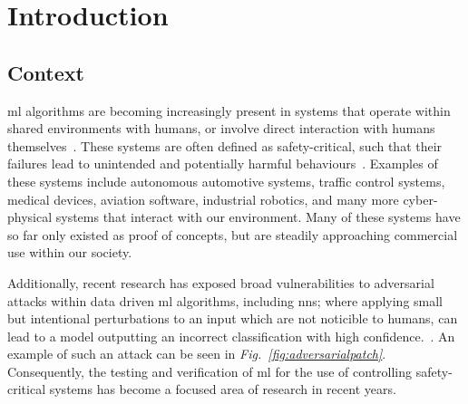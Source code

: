 
\chapter{Introduction} %
\label{Chapter1} %



\section{Context}

\Gls{ml} algorithms are becoming increasingly present in systems that operate within shared environments
with humans, or involve direct interaction with humans themselves~\citep{pereira}. These systems 
are often defined as safety-critical, such that their failures lead to unintended and potentially harmful behaviours~\citep{amodei}.
Examples of these systems include autonomous automotive systems, traffic control systems, medical devices, aviation software,
industrial robotics, and many more cyber-physical systems that interact with our environment.
Many of these systems have so far only existed as proof of concepts, but are steadily approaching commercial use within our society.

Additionally, recent research has exposed broad vulnerabilities to adversarial attacks within data driven \gls{ml} algorithms,
including \Glspl{nn}; where applying small but intentional perturbations to an input which are not noticible to humans,
can lead to a model outputting an incorrect classification with high confidence.~\citep{goodfellow}.
An example of such an attack can be seen in \textit{Fig.~\ref{fig:adversarialpatch}}.
Consequently, the testing and verification of \gls{ml} for the use of controlling safety-critical systems has become a focused area of research in recent years.


